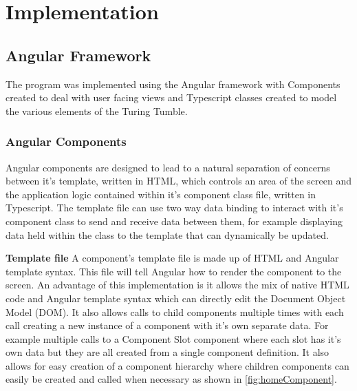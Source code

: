 \documentclass{l4proj}
\begin{document}
\chapter{Implementation}
\section{Angular Framework}
The program was implemented using the Angular framework with Components created to deal with user facing views and Typescript classes created to model the various elements of the Turing Tumble.

\subsection{Angular Components}
Angular components are designed to lead to a natural separation of concerns between it's template, written in HTML, which controls an area of the screen and the application logic contained within it's component class file, written in Typescript. The template file can use two way data binding to interact with it's component class to send and receive data between them, for example displaying data held within the class to the template that can dynamically be updated.


\textbf{Template file}
A component's template file is made up of HTML and Angular template syntax. This file will tell Angular how to render the component to the screen. An advantage of this implementation is it allows the mix of native HTML code and Angular template syntax which can directly edit the Document Object Model (DOM). It also allows calls to child components multiple times with each call creating a new instance of a component with it's own separate data. For example multiple calls to a Component Slot component where each slot has it's own data but they are all created from a single component definition. It also allows for easy creation of a component hierarchy where children components can easily be created and called when necessary as shown in \ref{fig:homeComponent}. 
\end{document}
